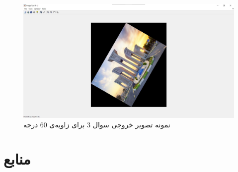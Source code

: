 \documentclass{article}
\begin{document}
\begin{figure}[H]
    \centering
    \includegraphics[width=1\textwidth]{figures/3a.jpg}
    \caption
	{
نمونه تصویر خروجی سوال 3 برای زاویه‌ی 60 درجه
	}
    \label{fig:fig1}
\end{figure}



\section*{منابع}
\renewcommand{\section}[2]{}%
\begin{thebibliography}{99} %


\begin{LTRitems}

\resetlatinfont

\end{LTRitems}

\end{thebibliography}
\end{document}
